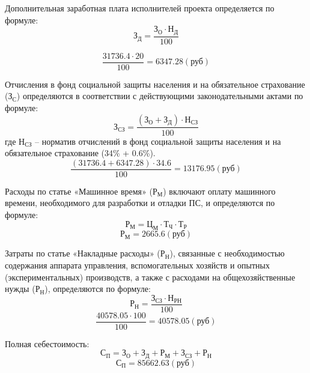Дополнительная заработная плата исполнителей проекта определяется по формуле:
\begin{equation}
\label{formula:economics:cost:f_add_zp}
{\text{З}}_{\text{Д}} = \frac{ {\text{З}}_{\text{О}} \cdot {\text{Н}}_{\text{Д}} }{ 100 }
\end{equation}

$$\frac{ 31736.4 \cdot 20 }{ 100 } = 6347.28 (\text{руб})$$

Отчисления в фонд социальной защиты населения и на обязательное страхование (${\text{З}}_{\text{С}}$) определяются в соответствии с действующими законодательными актами по формуле:
\begin{equation}
\label{formula:economics:cost:f_fszn}
{\text{З}}_{\text{СЗ}} = \frac{ ({\text{З}}_{\text{О}} + {\text{З}}_{\text{Д}}) \cdot {\text{Н}}_{\text{СЗ}} }{ 100 }
\end{equation}
где ${\text{Н}}_{\text{СЗ}}$ -- норматив отчислений в фонд социальной защиты населения и на обязательное страхование (34\% + 0.6\%).
$$\frac{ (31736.4 + 6347.28) \cdot 34.6 }{ 100 } = 13176.95 (\text{руб})$$

Расходы по статье «Машинное время» (${\text{Р}}_{\text{М}}$) включают оплату машинного времени, необходимого для разработки и отладки ПС, и определяются по формуле:
\begin{equation}
\label{formula:economics:cost:f_mt}
{\text{Р}}_{\text{М}} = {\text{Ц}}_{\text{М}} \cdot {\text{Т}}_{\text{Ч}} \cdot {\text{Т}}_{\text{Р}}
\end{equation}
$${\text{Р}}_{\text{М}} = 2665.6 (\text{руб})$$

Затраты по статье «Накладные расходы» (${\text{Р}}_{\text{Н}}$), связанные с необходимостью содержания аппарата управления, вспомогательных хозяйств и опытных (экспериментальных) производств, а также с расходами на общехозяйственные нужды (${\text{Р}}_{\text{Н}}$), определяются по формуле:
\begin{equation}
\label{formula:economics:cost:f_nr}
{\text{Р}}_{\text{Н}} = \frac{ {\text{З}}_{\text{СЗ}} \cdot {\text{Н}}_{\text{РН}} }{ 100 }
\end{equation}
$$\frac{ 40578.05 \cdot 100  }{ 100 } = 40578.05 (\text{руб})$$

Полная себестоимость:
\begin{equation}
\label{formula:economics:cost:f_psb}
{\text{С}}_{\text{П}} = {\text{З}}_{\text{О}} + {\text{З}}_{\text{Д}} + {\text{Р}}_{\text{М}} + {\text{З}}_{\text{СЗ}} + {\text{Р}}_{\text{Н}}
\end{equation}
$${\text{С}}_{\text{П}} = 85662.63 (\text{руб})$$

